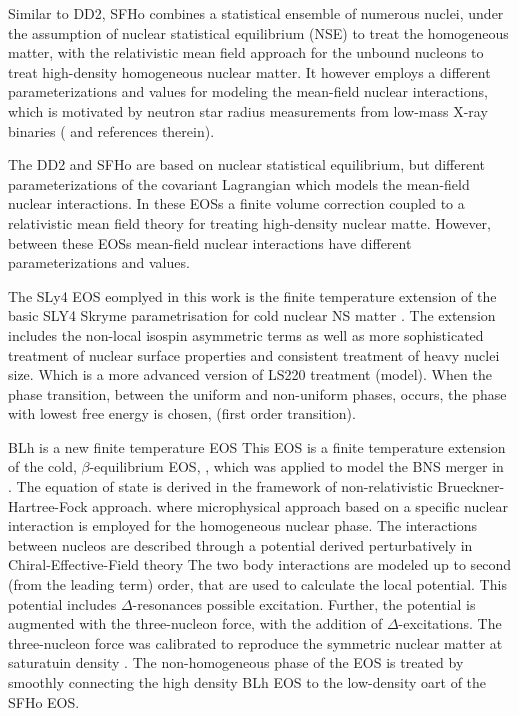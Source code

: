 \documentclass[11pt,a4paper,headinclude=true,DIV=14,BCOR=8mm,chapterprefix,listof=totoc,twoside,openright,abstracton]{scrbook}
\begin{document}
Similar to DD2, SFHo combines a statistical ensemble of numerous nuclei, under the assumption of nuclear
statistical equilibrium (NSE) to treat the homogeneous matter, 
with the relativistic mean field approach for the unbound nucleons to treat high-density homogeneous nuclear matter.
It however employs a different parameterizations and values for modeling the mean-field nuclear interactions, 
which is motivated by neutron star radius measurements from low-mass X-ray
binaries (\cite{Steiner:2012rk} and references therein).

The DD2 and SFHo are based on nuclear statistical equilibrium, but 
different parameterizations of the covariant Lagrangian which models the mean-field nuclear interactions.
In these EOSs a finite volume correction coupled to a relativistic mean field theory for treating high-density nuclear matte. However, between these EOSs mean-field nuclear interactions have different parameterizations and values.

The SLy4 EOS eomplyed in this work is the finite temperature extension \cite{daSilvaSchneider:2017jpg}
of the basic SLY4 Skryme parametrisation for cold nuclear NS matter \cite{Douchin:2001sv}.
The extension includes the non-local isospin asymmetric terms as well as more sophisticated 
treatment of nuclear surface properties and consistent treatment of heavy nuclei size. 
Which is a more advanced version of LS220 treatment (model).
When the phase transition, between the uniform and non-uniform phases, occurs, the phase with lowest 
free energy is chosen, (first order transition).

BLh is a new finite temperature EOS \cite{Logoteta:2020yxf}
This EOS is a finite temperature extension of the cold, $\beta$-equilibrium EOS, \cite{Bombaci:2018ksa},
which was applied to model the BNS merger in \cite{Endrizzi:2018uwl}.
The equation of state is derived in the framework of non-relativistic Brueckner-Hartree-Fock approach.
where microphysical approach based on a specific nuclear interaction is employed for the homogeneous nuclear phase.
The interactions between nucleos are described through a potential derived perturbatively 
in Chiral-Effective-Field theory \cite{Machleidt:2011zz}
The two body interactions are modeled up to second (from the leading term) order, that are used to calculate the local potential. This potential includes $\Delta$-resonances possible excitation. 
Further, the potential is augmented with the three-nucleon force, with the addition of $\Delta$-excitations.
The three-nucleon force was calibrated to reproduce the symmetric nuclear matter at saturatuin density \cite{Logoteta:2016nzc}.
The non-homogeneous phase of the EOS is treated by smoothly connecting the high density BLh EOS to the low-density oart of the SFHo EOS.
\end{document}

